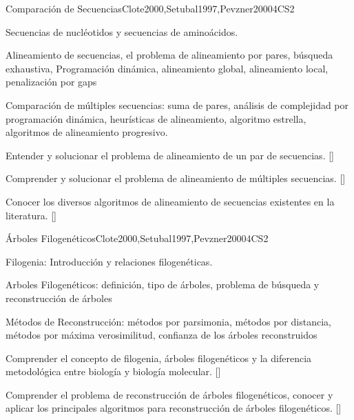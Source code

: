 \begin{syllabus}
\begin{unit}{Comparación de Secuencias}{}{Clote2000,Setubal1997,Pevzner2000}{4}{CS2}
\begin{topics}
    \item Secuencias de nucléotidos y secuencias de aminoácidos.
    \item Alineamiento de secuencias, el problema de alineamiento por pares, búsqueda exhaustiva, Programación dinámica, alineamiento global, alineamiento local, penalización por gaps
    \item Comparación de múltiples secuencias: suma de pares, análisis de complejidad por programación dinámica, heurísticas de alineamiento, algoritmo estrella, algoritmos de alineamiento progresivo.
\end{topics}
\begin{learningoutcomes}
    \item  Entender y solucionar el problema de alineamiento de un par de secuencias. [\Usage]
    \item  Comprender y solucionar el problema de alineamiento de múltiples secuencias. [\Usage]
    \item Conocer los diversos algoritmos de alineamiento de secuencias existentes en la literatura. [\Familiarity]
\end{learningoutcomes}
\end{unit}

\begin{unit}{Árboles Filogenéticos}{}{Clote2000,Setubal1997,Pevzner2000}{4}{CS2}
\begin{topics}
    \item Filogenia: Introducción y relaciones filogenéticas.
    \item Arboles Filogenéticos: definición, tipo de árboles, problema de búsqueda y reconstrucción de árboles
    \item Métodos de Reconstrucción: métodos por parsimonia, métodos por distancia, métodos por máxima verosimilitud, confianza de los árboles reconstruidos
\end{topics}

\begin{learningoutcomes}
    \item  Comprender el concepto de filogenia, árboles filogenéticos y la diferencia metodológica entre biología y biología molecular. [\Familiarity]
    \item Comprender el problema de reconstrucción de árboles filogenéticos, conocer y aplicar los principales algoritmos para reconstrucción de árboles filogenéticos. [\Assessment]
\end{learningoutcomes}
\end{unit}


\end{syllabus}
